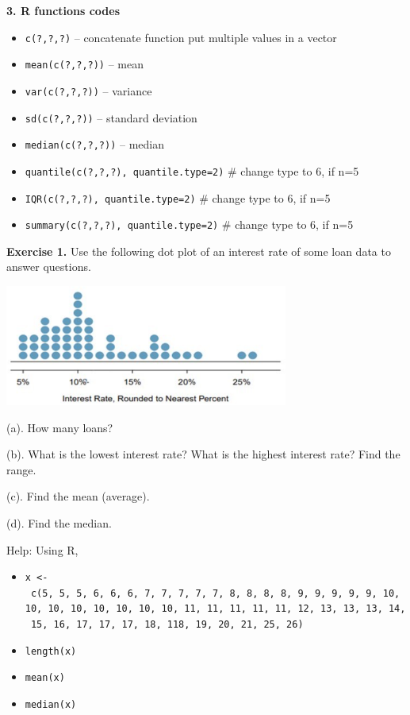 \documentclass[
]{book}
\providecommand{\tightlist}{%
  \setlength{\itemsep}{0pt}\setlength{\parskip}{0pt}}
\begin{document}
\textbf{3. R functions codes}

\begin{itemize}
\tightlist
\item
  \texttt{c(?,?,?)} -- concatenate function put multiple values in a vector
\item
  \texttt{mean(c(?,?,?))} -- mean
\item
  \texttt{var(c(?,?,?))} -- variance
\item
  \texttt{sd(c(?,?,?))} -- standard deviation
\item
  \texttt{median(c(?,?,?))} -- median
\item
  \texttt{quantile(c(?,?,?),\ quantile.type=2)} \# change type to 6, if n=5
\item
  \texttt{IQR(c(?,?,?),\ quantile.type=2)} \# change type to 6, if n=5
\item
  \texttt{summary(c(?,?,?),\ quantile.type=2)} \# change type to 6, if n=5
\end{itemize}

\textbf{Exercise 1.} Use the following dot plot of an interest rate of some loan data to answer questions.

\includegraphics[width=3.66667in,height=\textheight]{images/img23.png}

(a). How many loans?

(b). What is the lowest interest rate? What is the highest interest rate? Find the range.

(c). Find the mean (average).

(d). Find the median.

Help: Using R,

\begin{itemize}
\item
  \texttt{x\ \textless{}-\ c(5,\ 5,\ 5,\ 6,\ 6,\ 6,\ 7,\ 7,\ 7,\ 7,\ 7,\ 8,\ 8,\ 8,\ 8,\ 9,\ 9,\ 9,\ 9,\ 9,\ 10,\ 10,\ 10,\ 10,\ 10,\ 10,\ 10,\ 10,\ 11,\ 11,\ 11,\ 11,\ 11,\ 12,\ 13,\ 13,\ 13,\ 14,\ 15,\ 16,\ 17,\ 17,\ 17,\ 18,\ 118,\ 19,\ 20,\ 21,\ 25,\ 26)}
\item
  \texttt{length(x)}
\item
  \texttt{mean(x)}
\item
  \texttt{median(x)}
\end{itemize}
\end{document}
